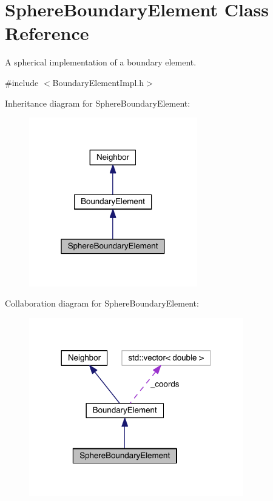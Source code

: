 \hypertarget{classSphereBoundaryElement}{\section{Sphere\+Boundary\+Element Class Reference}
\label{classSphereBoundaryElement}
}


A spherical implementation of a boundary element.  




{\ttfamily \#include $<$Boundary\+Element\+Impl.\+h$>$}



Inheritance diagram for Sphere\+Boundary\+Element\+:\nopagebreak
\begin{figure}[H]
\begin{center}
\leavevmode
\includegraphics[width=208pt]{classSphereBoundaryElement__inherit__graph}
\end{center}
\end{figure}


Collaboration diagram for Sphere\+Boundary\+Element\+:\nopagebreak
\begin{figure}[H]
\begin{center}
\leavevmode
\includegraphics[width=264pt]{classSphereBoundaryElement__coll__graph}
\end{center}
\end{figure}
